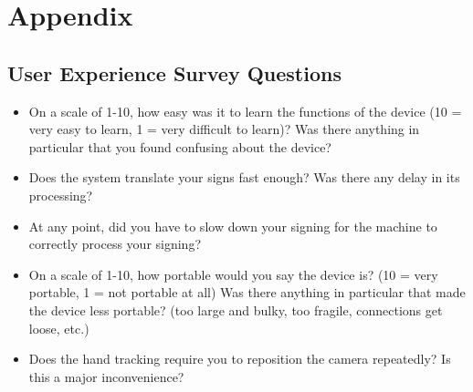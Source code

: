 \documentclass[12pt]{article}
\begin{document}

					
					
					
					





				




\newpage

\section{Appendix}

\subsection{User Experience Survey Questions}
\begin{itemize}
  \item On a scale of 1-10, how easy was it to learn the functions of the device (10 = very easy to learn, 1 = very difficult to learn)? Was there anything in 
  particular that you found confusing about the device?
  \item Does the system translate your signs fast enough? Was there any delay in its processing?
  \item At any point, did you have to slow down your signing for the machine to correctly process your signing?
  \item On a scale of 1-10, how portable would you say the device is? (10 = very portable, 1 = not portable at all) Was there anything in particular that made 
  the device less portable? (too large and bulky, too fragile, connections get loose, etc.)
  \item Does the hand tracking require you to reposition the camera repeatedly? Is this a major inconvenience?
\end{itemize}
\end{document}
